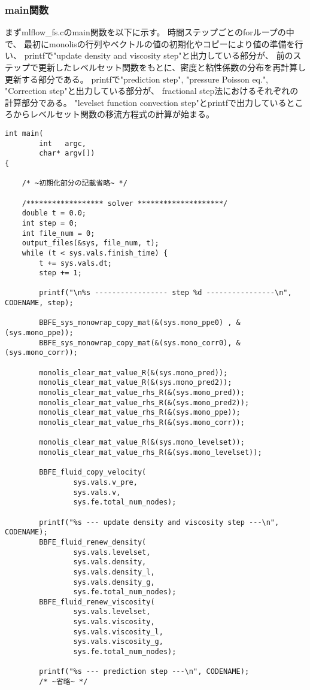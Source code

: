 \subsubsection{main関数}
まずmlflow\_fs.cのmain関数を以下に示す。
時間ステップごとのforループの中で、
最初にmonolisの行列やベクトルの値の初期化やコピーにより値の準備を行い、
printfで"update density and viscosity step"と出力している部分が、
前のステップで更新したレベルセット関数をもとに、密度と粘性係数の分布を再計算し更新する部分である。
printfで"prediction step", "pressure Poisson eq.", "Correction step"と出力している部分が、
fractional step法におけるそれぞれの計算部分である。
"levelset function convection step"とprintfで出力しているところからレベルセット関数の移流方程式の計算が始まる。
\begin{lstlisting}[caption = mlflow\_fs.cのmain関数のレベルセット関数の計算部分抜粋]
int main(
		int   argc,
		char* argv[])
{
　
	/* ~初期化部分の記載省略~ */

	/****************** solver ********************/
	double t = 0.0;
	int step = 0;
	int file_num = 0;
	output_files(&sys, file_num, t);
	while (t < sys.vals.finish_time) {
		t += sys.vals.dt;
		step += 1;

		printf("\n%s ----------------- step %d ----------------\n", CODENAME, step);

		BBFE_sys_monowrap_copy_mat(&(sys.mono_ppe0) , &(sys.mono_ppe));
		BBFE_sys_monowrap_copy_mat(&(sys.mono_corr0), &(sys.mono_corr));

		monolis_clear_mat_value_R(&(sys.mono_pred));
		monolis_clear_mat_value_R(&(sys.mono_pred2));
		monolis_clear_mat_value_rhs_R(&(sys.mono_pred));
		monolis_clear_mat_value_rhs_R(&(sys.mono_pred2));
		monolis_clear_mat_value_rhs_R(&(sys.mono_ppe));
		monolis_clear_mat_value_rhs_R(&(sys.mono_corr));
		
		monolis_clear_mat_value_R(&(sys.mono_levelset));
		monolis_clear_mat_value_rhs_R(&(sys.mono_levelset));

		BBFE_fluid_copy_velocity(
				sys.vals.v_pre, 
				sys.vals.v,
				sys.fe.total_num_nodes);

		printf("%s --- update density and viscosity step ---\n", CODENAME);
		BBFE_fluid_renew_density(
				sys.vals.levelset, 
				sys.vals.density,
				sys.vals.density_l,
				sys.vals.density_g,
				sys.fe.total_num_nodes);
		BBFE_fluid_renew_viscosity(
				sys.vals.levelset, 
				sys.vals.viscosity,
				sys.vals.viscosity_l,
				sys.vals.viscosity_g,
				sys.fe.total_num_nodes);

		printf("%s --- prediction step ---\n", CODENAME);
		/* ~省略~ */


\end{lstlisting}
